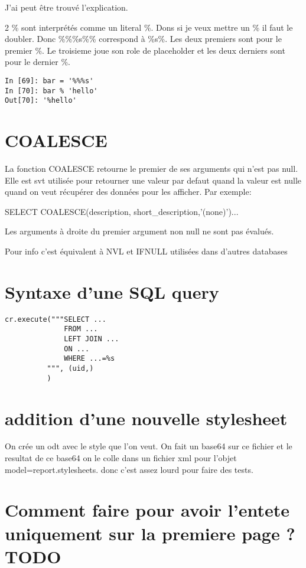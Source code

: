 \documentclass[12pt,a4paper]{article}
\begin{document}
J'ai peut être trouvé l'explication.

2 \% sont interprétés comme un literal \%. Dons si je veux mettre un \% il faut le doubler. Donc \%\%\%s\%\% correspond à \%s\%. Les deux premiers sont pour le premier \%. Le troisieme joue son role de placeholder et les deux derniers sont pour le dernier \%.  

\begin{verbatim}
In [69]: bar = '%%%s'
In [70]: bar % 'hello'
Out[70]: '%hello'
\end{verbatim}

\section{COALESCE}
\label{sec:coalesce}

La fonction COALESCE retourne le premier de ses arguments qui n'est pas null. 
Elle est svt utilisée pour retourner une valeur par defaut quand la valeur est nulle quand on veut récupérer des données pour les afficher. Par exemple:

SELECT COALESCE(description, short\_description,'(none)')...

Les arguments à droite du premier argument non null ne sont pas évalués.

Pour info c'est équivalent à NVL et IFNULL utilisées dans d'autres databases

\section{Syntaxe d'une SQL query}
\label{sec:sqlquery}

\begin{verbatim}
cr.execute("""SELECT ...
              FROM ...
              LEFT JOIN ...
              ON ...
              WHERE ...=%s
          """, (uid,)
          )
\end{verbatim}

\section{addition d'une nouvelle stylesheet}
On crée un odt avec le style que l'on veut.
On fait un base64 sur ce fichier et le resultat de ce base64 on le colle dans un
fichier xml pour l'objet model=report.stylesheets.
donc c'est assez lourd pour faire des tests.
\section{Comment faire pour avoir l'entete uniquement sur la premiere page ?TODO}
\label{sec:first_page_header}
\end{document}
